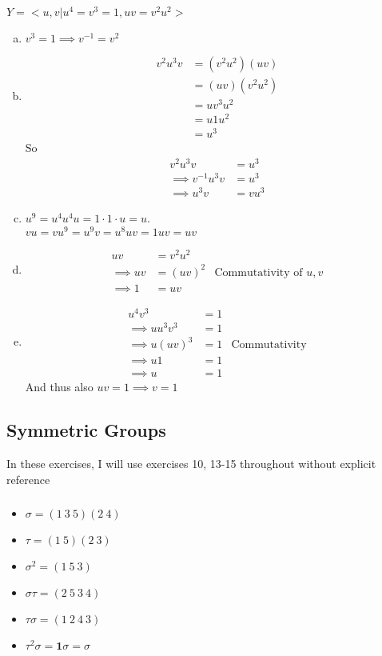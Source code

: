 \documentclass{article}
\newcommand{\inv}[1]{ {#1}^{-1} }
\newcommand{\id}{ \bm{1} }
\begin{document}
\subsubsection{}
$Y = <u,v| u^4 = v^3 = 1, uv = v^2u^2>$
\begin{enumerate}[(a)]
\item $v^3 = 1 \implies \inv{v} = v^2$ \label{2p18a}
\item \label{2p18b}
\begin{align*}
v^2u^3v &= (v^2u^2)(uv)\\
&= (uv)(v^2u^2)\\
&= uv^3u^2\\
&= u1u^2\\
&= u^3
\end{align*}
So
\begin{align*}
v^2u^3v &= u^3\\
\implies \inv{v}u^3v &= u^3\\
\implies u^3v &= vu^3
\end{align*}
\item \label{2p18c}
$u^9 = u^4u^4u = 1\cdot1\cdot u = u$.\\
$vu = vu^9 = u^9v = u^8uv = 1uv = uv$
\item \label{2p18d}
\begin{align*}
uv &= v^2u^2\\
\implies uv &= (uv)^2 &  \mbox{Commutativity of $u,v$}\\
\implies 1 &= uv
\end{align*}
\item \label{2p18e}
\begin{align*}
u^4v^3 &= 1\\
\implies uu^3v^3 &= 1\\
\implies u(uv)^3 &= 1 & \mbox{Commutativity}\\
\implies u1 &= 1\\
\implies u &= 1
\end{align*}
And thus also $uv = 1 \implies v = 1$
\end{enumerate}
\subsection{Symmetric Groups}
In these exercises, I will use exercises 10, 13-15 throughout without explicit reference
\subsubsection{}
\begin{itemize}
\item $\sigma = (1\ 3\ 5)(2\ 4)$
\item $\tau = (1\ 5)(2\ 3)$
\item $\sigma^2 = (1\ 5\ 3)$
\item $\sigma\tau = (2\ 5\ 3\ 4)$
\item $\tau\sigma = (1\ 2\ 4\ 3)$
\item $\tau^2\sigma = \id\sigma = \sigma$
\end{itemize}
\end{document}
